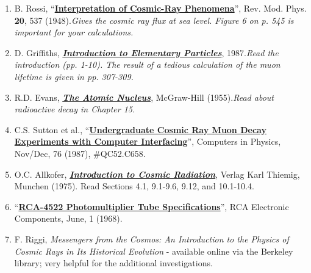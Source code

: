 \documentclass{../lab}
\begin{document}
\begin{enumerate}
    \item B. Rossi, ``\href{https://drive.google.com/file/d/1tFUQJkkIA-OwbRkS-L1pOJuPoD6z67KY/view?usp=drive_link}{\textbf{Interpretation of Cosmic-Ray Phenomena}}'', Rev. Mod. Phys. \textbf{20}, 537 (1948).\emph{Gives the cosmic ray flux at sea level. Figure 6 on p. 545 is important for your calculations.}

    \item D. Griffiths, \emph{\href{https://drive.google.com/file/d/18XScxxcYNKgADn1AqmlNitSiLdN9WW2b/view?usp=drive_link}{\textbf{Introduction to Elementary Particles}}}, 1987.\emph{Read the introduction (pp. 1-10). The result of a tedious calculation of the muon lifetime is given in pp. 307-309.}

    \item R.D. Evans, \emph{\href{https://drive.google.com/file/d/1ttYuACjCZGCMiR4tlyA9ec0YPbtUQsoy/view?usp=drive_link}{\textbf{The Atomic Nucleus}}}, McGraw-Hill (1955).\emph{Read about radioactive decay in Chapter 15.}

    \item C.S. Sutton et al., ``\href{https://drive.google.com/file/d/13LiC-VXNr-rjJ6sgqPZBUyezSClVRsEr/view?usp=drive_link}{\textbf{Undergraduate Cosmic Ray Muon Decay Experiments with Computer Interfacing}}'', Computers in Physics, Nov/Dec, 76 (1987), \#QC52.C658.

    \item O.C. Allkofer, \emph{\href{https://drive.google.com/file/d/1Ebsxt4--LJtIjk3qoaF1UQJ9aWObm_ok/view?usp=drive_link}{\textbf{Introduction to Cosmic Radiation}}}, Verlag Karl Thiemig, Munchen (1975). Read Sections 4.1, 9.1-9.6, 9.12, and 10.1-10.4.

    \item ``\href{https://drive.google.com/file/d/11fBl7c2Y8gVauK7lk-19jTY8A2UyLBjU/view?usp=drive_link}{\textbf{RCA-4522 Photomultiplier Tube Specifications}}'', RCA Electronic Components, June, 1 (1968).

    \item F. Riggi, \textit{Messengers from the Cosmos: An Introduction to the Physics of Cosmic Rays in Its Historical Evolution} - available online via the Berkeley library; very helpful for the additional investigations.


\end{enumerate}
\end{document}
